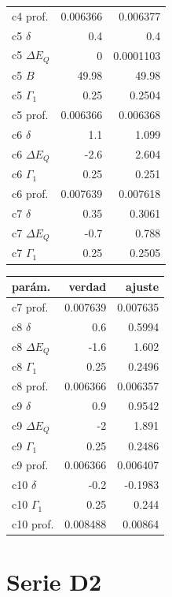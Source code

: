 {\begin{tabular}[t]{@{}lrr@{}}
c4 prof. & 0.006366 & 0.006377\\
c5 $\delta$ & 0.4 & 0.4\\
c5 $\Delta E_Q$ & 0 & 0.0001103\\
c5 $B$ & 49.98 & 49.98\\
c5 $\Gamma_1$ & 0.25 & 0.2504\\
c5 prof. & 0.006366 & 0.006368\\
c6 $\delta$ & 1.1 & 1.099\\
c6 $\Delta E_Q$ & -2.6 & 2.604\\
c6 $\Gamma_1$ & 0.25 & 0.251\\
c6 prof. & 0.007639 & 0.007618\\
c7 $\delta$ & 0.35 & 0.3061\\
c7 $\Delta E_Q$ & -0.7 & 0.788\\
c7 $\Gamma_1$ & 0.25 & 0.2505\\
\bottomrule
\end{tabular}\hspace{6pt}\begin{tabular}[t]{@{}lrr@{}}
\toprule
par\'am. & verdad & ajuste\\
\midrule
c7 prof. & 0.007639 & 0.007635\\
c8 $\delta$ & 0.6 & 0.5994\\
c8 $\Delta E_Q$ & -1.6 & 1.602\\
c8 $\Gamma_1$ & 0.25 & 0.2496\\
c8 prof. & 0.006366 & 0.006357\\
c9 $\delta$ & 0.9 & 0.9542\\
c9 $\Delta E_Q$ & -2 & 1.891\\
c9 $\Gamma_1$ & 0.25 & 0.2486\\
c9 prof. & 0.006366 & 0.006407\\
c10 $\delta$ & -0.2 & -0.1983\\
c10 $\Gamma_1$ & 0.25 & 0.244\\
c10 prof. & 0.008488 & 0.00864\\
\bottomrule
\end{tabular}}\par\vspace{8pt}

\section{Serie D2}

